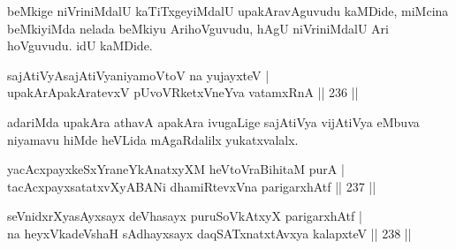 \begin{artha}
beMkige niVriniMdalU kaTiTxgeyiMdalU upakAravAguvudu kaMDide, miMcina beMkiyiMda nelada beMkiyu ArihoVguvudu, hAgU niVriniMdalU Ari hoVguvudu. idU kaMDide.
\end{artha}

\begin{shl}
sajAtiVyAsajAtiVyaniyamoV\s toV na yujayxteV | \\
upakArApakAratevxV pUvoVRketxVneYva vatamxRnA \hfill ||  236 ||  
\end{shl}

\begin{artha}
adariMda upakAra athavA apakAra ivugaLige sajAtiVya vijAtiVya eMbuva niyamavu hiMde heVLida mAgaRdalilx yukatxvalalx.
\end{artha}

\begin{shl}
yacAcxpayxkeSxYraneYkAnatxyXM heVtoVraBihitaM purA | \\
tacAcxpayxsatatxvXyA\s BANi dhamiRtevxVna parigarxhAtf \hfill ||  237 ||  
\end{shl}
				
\begin{shl}
seVnidxrXyasAyxsayx deVhasayx puruSoVkAtxyX parigarxhAtf | \\
na heyxVkadeVshaH sAdhayxsayx daqSATxnatxtAvxya kalapxteV \hfill ||  238 ||  
\end{shl}

